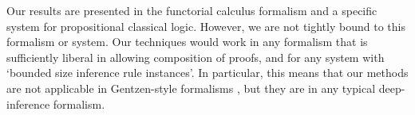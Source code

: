 Our results are presented in the functorial calculus formalism and a specific
system for propositional classical logic. However, we are not tightly bound to
this formalism or system. Our techniques would work in any formalism that
is sufficiently liberal in allowing composition of proofs, and for any system
with `bounded size inference rule instances'. In particular, this means that
our methods are not applicable in Gentzen-style formalisms
\cite{Brun:03:Two-Rest:mn}, but they are in any typical deep-inference
formalism.
% 
% 
% 
% 
% 
